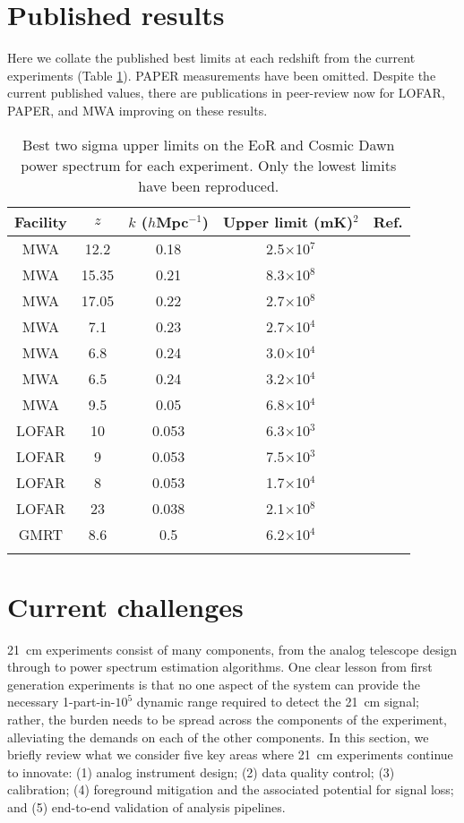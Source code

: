 \section{Published results}
\label{sec:results}
Here we collate the published best limits at each redshift from the current experiments (Table \ref{table:limits}). PAPER measurements have been omitted. Despite the current published values, there are publications in peer-review now for LOFAR, PAPER, and MWA improving on these results.
\begin{table}[ht]
\centering
\begin{tabular}{|c|c|c|c|c|}
\hline
Facility & $z$ & $k$ ($h$Mpc$^{-1}$) & Upper limit (mK)$^2$ & Ref. \\
\hline
MWA & 12.2 & 0.18 & 2.5$\times$10$^7$ & \cite{ewall-wice16}\\
MWA & 15.35 & 0.21 & 8.3$\times$10$^8$ & \cite{ewall-wice16}\\
MWA & 17.05 & 0.22 & 2.7$\times$10$^8$ & \cite{ewall-wice16}\\
MWA & 7.1 & 0.23 & 2.7$\times$10$^4$ & \cite{beardsley16}\\
MWA & 6.8 & 0.24 & 3.0$\times$10$^4$ & \cite{beardsley16}\\
MWA & 6.5 & 0.24 & 3.2$\times$10$^4$ & \cite{beardsley16}\\
MWA & 9.5 & 0.05 & 6.8$\times$10$^4$ & \cite{dillon15}\\
LOFAR & 10 & 0.053 & 6.3$\times$10$^3$ & \cite{patil16}\\
LOFAR & 9 & 0.053 & 7.5$\times$10$^3$ & \cite{patil16}\\
LOFAR & 8 & 0.053 & 1.7$\times$10$^4$ & \cite{patil16}\\
LOFAR & 23 & 0.038 & 2.1$\times$10$^8$ & \cite{2018arXiv180906661G}\\
GMRT & 8.6 & 0.5 & 6.2$\times$10$^4$ & \cite{paciga13}\\
\hline
\label{table:limits}
\end{tabular}
\caption{Best two sigma upper limits on the EoR and Cosmic Dawn power spectrum for each experiment. Only the lowest limits have been reproduced.}
\end{table}


\section{Current challenges}
\label{sec:challenges}
21~cm experiments consist of many components, from the analog telescope design through to power spectrum estimation algorithms.  One clear lesson from first generation experiments is that no one aspect of the system can provide the necessary 1-part-in-$10^5$ dynamic range required to detect the 21~cm signal; rather, the burden needs to be spread across the components of the experiment, alleviating the demands on each of the other components.  In this section, we briefly review what we consider five key areas where 21~cm experiments continue to innovate: (1) analog instrument design; (2) data quality control; (3) calibration; (4) foreground mitigation and the associated potential for signal loss; and (5) end-to-end validation of analysis pipelines.

